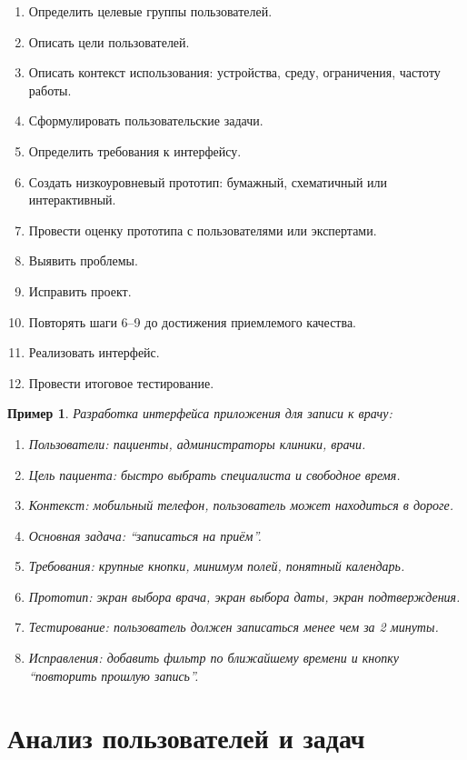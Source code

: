 \documentclass[12pt,a4paper]{article}
\newtheorem{example}{Пример}
\begin{document}
\begin{enumerate}
    \item Определить целевые группы пользователей.
    \item Описать цели пользователей.
    \item Описать контекст использования: устройства, среду, ограничения, частоту работы.
    \item Сформулировать пользовательские задачи.
    \item Определить требования к интерфейсу.
    \item Создать низкоуровневый прототип: бумажный, схематичный или интерактивный.
    \item Провести оценку прототипа с пользователями или экспертами.
    \item Выявить проблемы.
    \item Исправить проект.
    \item Повторять шаги 6--9 до достижения приемлемого качества.
    \item Реализовать интерфейс.
    \item Провести итоговое тестирование.
\end{enumerate}

\begin{example}
Разработка интерфейса приложения для записи к врачу:
\begin{enumerate}
    \item Пользователи: пациенты, администраторы клиники, врачи.
    \item Цель пациента: быстро выбрать специалиста и свободное время.
    \item Контекст: мобильный телефон, пользователь может находиться в дороге.
    \item Основная задача: ``записаться на приём''.
    \item Требования: крупные кнопки, минимум полей, понятный календарь.
    \item Прототип: экран выбора врача, экран выбора даты, экран подтверждения.
    \item Тестирование: пользователь должен записаться менее чем за 2 минуты.
    \item Исправления: добавить фильтр по ближайшему времени и кнопку ``повторить прошлую запись''.
\end{enumerate}
\end{example}

\section{Анализ пользователей и задач}
\end{document}

